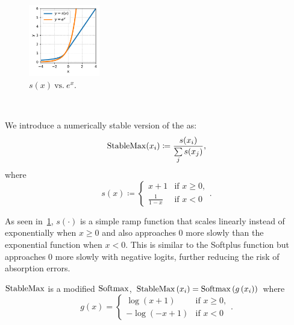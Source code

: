 \begin{figure}
            \vspace{-6.mm}
            \begin{center}
    \includegraphics[width=0.275\textwidth]{grokking_iclr_arxiv/figures/soft_exponential.pdf}
            \end{center}
            \vspace{-18pt}
            \caption{$s(x)~\mathrm{vs.}~e^x$.}
            \label{fig:stablemax}
        \end{figure} 
        \noindent\textbf{~~}\vspace{-2.mm}
\begin{dfn}[$\stablemax$]
We introduce a numerically stable version of the \softmax as: 
\begin{equation}
    \mathrm{StableMax}(x_i) \coloneq \frac{s(x_i)}{\sum\limits_j s(x_j)},
\end{equation}
where
\begin{equation}
s(x) \coloneq \begin{cases}
x+1 & \text{if } x \geq 0, \\
\frac{1}{1-x} & \text{if } x < 0
\end{cases}.
\end{equation}
\end{dfn}

As seen in~\cref{fig:stablemax}, $s(\cdot)$ is a simple ramp function that scales linearly instead of exponentially when $x\geq0$ and also approaches 0 more slowly than the exponential function when $x<0$. This is similar to the Softplus function \citep{softplus} but approaches 0 more slowly with negative logits, further reducing the risk of absorption errors.

\begin{prop}\label{prop:stablemax}
$\stablemax$ is a modified $\mathrm{Softmax}$, \ie 
$\mathrm{StableMax}\left(x_i\right) = \mathrm{Softmax}\left(g\left(x_i\right)\right)$ where
\begin{equation}
         g(x) = \begin{cases}
\log(x+1) & \text{if } x \geq 0, \\
-\log(-x+1) & \text{if } x < 0
\end{cases}.
\end{equation}
\end{prop}


